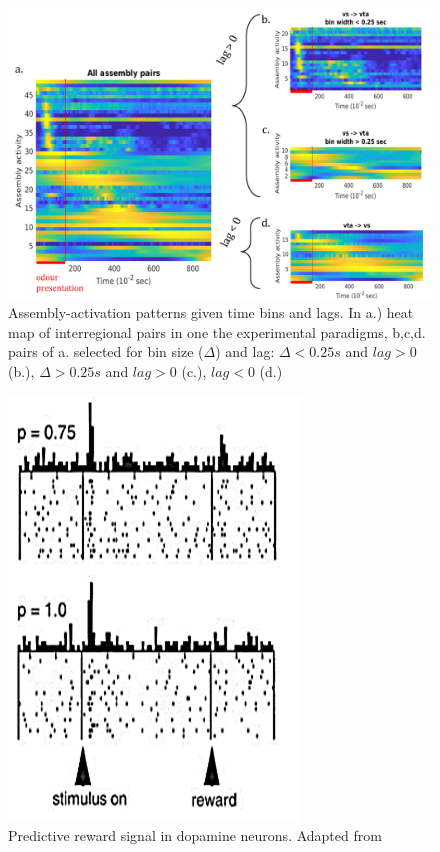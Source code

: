 \begin{figure}[h!]
    \centering
    \includegraphics[scale=0.6]{figures/AsActPerBinLag1.png}
    \caption{Assembly-activation patterns given time bins and lags. In a.) heat map of interregional pairs in one the experimental paradigms, b,c,d. pairs of a. selected for bin size ($\Delta$) and lag: $\Delta < 0.25 s$ and $lag > 0$ (b.), $\Delta > 0.25 s$ and $lag > 0$ (c.), $lag < 0$ (d.)}
    \label{fig:AsActBinLag}
\end{figure}
\begin{figure}[h!]
    \centering
    \includegraphics{figures/RewPred1.png}
    \caption{Predictive reward signal in dopamine neurons. Adapted from \cite{Fiorillo}}
    \label{fig:RewPred}
\end{figure}
\pagebreak
